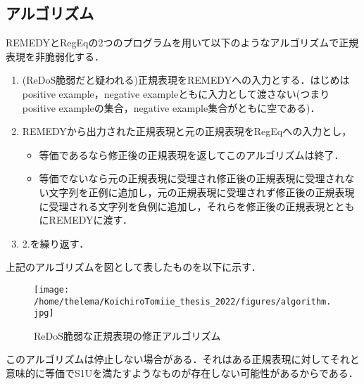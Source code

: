 \documentclass[a4paper, 12pt, dvipdfmx, uplatex]{jsreport}
\begin{document}
\subsection{アルゴリズム}
REMEDYとRegEqの2つのプログラムを用いて以下のようなアルゴリズムで正規表現を非脆弱化する．
\begin{enumerate}
  \item (ReDoS脆弱だと疑われる)正規表現をREMEDYへの入力とする．はじめはpositive example，negative exampleともに入力として渡さない(つまりpositive exampleの集合，negative example集合がともに空である)．
  \item REMEDYから出力された正規表現と元の正規表現をRegEqへの入力とし，
  \begin{itemize}
    \item 等価であるなら修正後の正規表現を返してこのアルゴリズムは終了．
    \item 等価でないなら元の正規表現に受理され修正後の正規表現に受理されない文字列を正例に追加し，元の正規表現に受理されず修正後の正規表現に受理される文字列を負例に追加し，それらを修正後の正規表現とともにREMEDYに渡す．
  \end{itemize}
  \item 2.を繰り返す．
\end{enumerate}

上記のアルゴリズムを図として表したものを以下に示す．

\begin{figure}[H] %
  \centering
  \texttt{[image: /home/thelema/KoichiroTomiie\_thesis\_2022/figures/algorithm.jpg]}
  \caption{ReDoS脆弱な正規表現の修正アルゴリズム\label{repair}}
\end{figure}


このアルゴリズムは停止しない場合がある．それはある正規表現に対してそれと意味的に等価でS1Uを満たすようなものが存在しない可能性があるからである．


% 
% 
\end{document}

